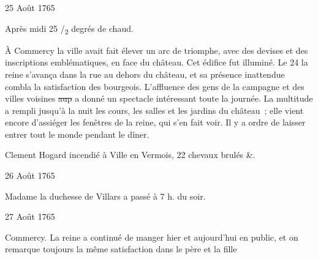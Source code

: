                      
                     \begin{diary}{25 Août 1765}{}
                        
                        
                           Après
                              midi
                           25 /\textsubscript{2} degrés de chaud. \bigskip
        
        
                         À Commercy la ville avait fait élever
                           un arc de triomphe, avec des devises et des
                           inscriptions emblématiques, en
                              face du
                              château. Cet édifice fut illuminé. Le 24
                           la reine s'avança
                           dans la rue au dehors
                           du château, et sa présence inattendue combla
                           la satisfaction des bourgeois. L'affluence
                           des gens de la campagne et des villes voisines
                           \sout{aup} a donné un spectacle intéressant
                           toute la journée. La multitude a rempli
                           jusqu'à la nuit les cours, les salles et les
                           jardins du château ; elle vient encore d'assiéger
                           les fenêtres de la
                              reine, qui s'en fait voir.
                           Il y a ordre de laisser entrer tout le monde
                           pendant le dîner. \bigskip
        
        
                        
                           Clement
                           Hogard
                           incendié à Ville en Vermois,
                           22 chevaux brulés &. \bigskip
        
        
                     \end{diary}

                     \begin{diary}{26 Août 1765}{}
                        
                        
                           Madame la duchesse de Villars a passé à
                           7 h. du soir. \bigskip
        
        
                     \end{diary}

                     \begin{diary}{27 Août 1765}{}
                        
                        
                           Commercy. La reine a continué de manger
                           hier et aujourd'hui en public, et on remarque
                           toujours la même satisfaction dans le père et la
                              fille
                        \bigskip
        
        
                     \end{diary}

